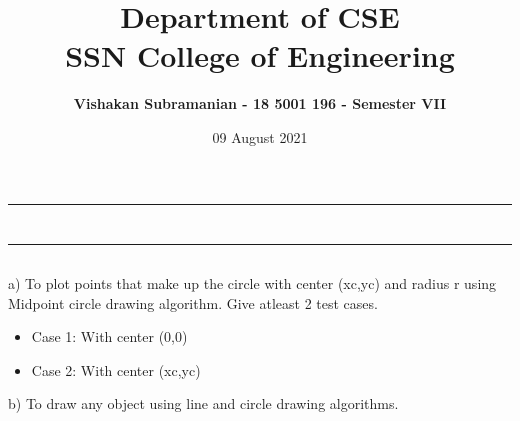 \documentclass[12pt, a4]{article}
\title{\textbf{Department of CSE\\SSN College of Engineering}}
\author{\textbf{Vishakan Subramanian - 18 5001 196 - Semester VII}}
\date{09 August 2021}
\begin{document}
\maketitle
\hrule
\section*{}
\hrule
\bigskip

\subsection*{}
\subsection*{}
\begin{flushleft}
a) To plot points that make up the circle with center (xc,yc) and radius r using Midpoint circle drawing
algorithm. Give atleast 2 test cases.

\begin{itemize}
\item Case 1: With center (0,0)
\item Case 2: With center (xc,yc)
\end{itemize}

b) To draw any object using line and circle drawing algorithms. 
\newline
\newline
 
\end{flushleft}

\newpage
\subsection*{}
\begin{flushleft}

\end{flushleft}


\newpage
\end{document}
